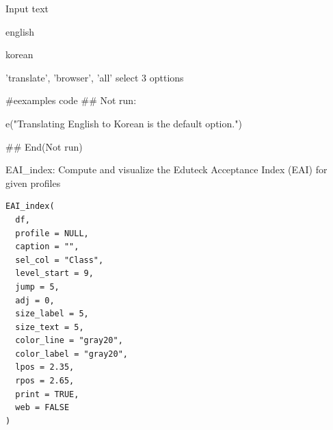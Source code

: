 \documentclass[a4paper]{book}
\begin{document}
%
\begin{Arguments}
\begin{ldescription}
\item[\code{text}] Input text

\item[\code{slang}] english

\item[\code{elang}] korean

\item[\code{show}] 'translate', 'browser', 'all' select 3 opttions
\end{ldescription}
\end{Arguments}
%
\begin{Examples}
\begin{ExampleCode}
#eexamples code
## Not run: 

e("Translating English to Korean is the default option.")

## End(Not run)



\end{ExampleCode}
\end{Examples}
%
\begin{Description}
EAI\_index: Compute and visualize the Eduteck Acceptance Index (EAI) for given profiles
\end{Description}
%
\begin{Usage}
\begin{verbatim}
EAI_index(
  df,
  profile = NULL,
  caption = "",
  sel_col = "Class",
  level_start = 9,
  jump = 5,
  adj = 0,
  size_label = 5,
  size_text = 5,
  color_line = "gray20",
  color_label = "gray20",
  lpos = 2.35,
  rpos = 2.65,
  print = TRUE,
  web = FALSE
)
\end{verbatim}
\end{Usage}
%
\end{document}
